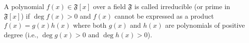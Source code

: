 A polynomial $f(x) \in \mathfrak{F}[x]$ over a field $\mathfrak{F}$ is called irreducible (or prime in $\mathfrak{F}[x]$) if $\deg f(x) > 0$ and $f(x)$ cannot be expressed as a product $f(x) = g(x)h(x)$ where both $g(x)$ and $h(x)$ are polynomials of positive degree (i.e., $\deg g(x) > 0$ and $\deg h(x) > 0$).
